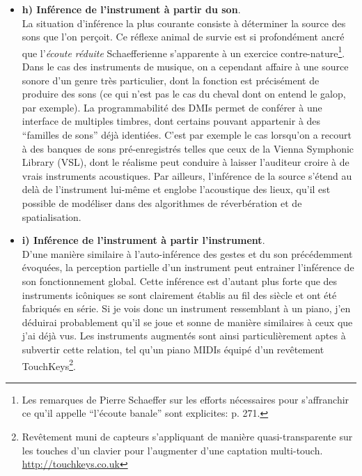 \begin{itemize}[noitemsep]
	\item \textbf{h) Inférence de l'instrument à partir du son}.\\
	\label{sec:gesture:inferences-soudure:inferences:instrument-sound}
	La situation d'inférence la plus courante consiste à déterminer la source des sons que l'on perçoit. Ce réflexe animal de survie est si profondément ancré que l'\textit{écoute réduite} Schaefferienne s'apparente à un exercice contre-nature\footnote{Les remarques de Pierre Schaeffer sur les efforts nécessaires pour s'affranchir ce qu'il appelle ``l'écoute banale'' sont explicites:  \cite{schaeffer_traite_1966} p. 271.}. Dans le cas des instruments de musique, on a cependant affaire à une source sonore d'un genre très particulier, dont la fonction est précisément de produire des sons (ce qui n'est pas le cas du cheval dont on entend le galop, par exemple). La programmabilité des \glspl{DMI} permet de conférer à une interface de multiples timbres, dont certains pouvant appartenir à des ``familles de sons'' déjà identiées. C'est par exemple le cas lorsqu'on a recourt à des banques de sons pré-enregistrés telles que ceux de la Vienna Symphonic Library (VSL), dont le réalisme peut conduire à laisser l'auditeur croire à de vrais instruments acoustiques. Par ailleurs, l'inférence de la source s'étend au delà de l'instrument lui-même et englobe l'acoustique des lieux, qu'il est possible de modéliser dans des algorithmes de réverbération et de spatialisation.

	\item \textbf{i) Inférence de l'instrument à partir l'instrument}.\\
	D'une manière similaire à l'auto-inférence des gestes et du son précédemment évoquées, la perception partielle d'un instrument peut entrainer l'inférence de son fonctionnement global. Cette inférence est d'autant plus forte que des instruments icôniques se sont clairement établis au fil des siècle et ont été fabriqués en série. Si je vois donc un instrument ressemblant à un piano, j'en déduirai probablement qu'il se joue et sonne de manière similaires à ceux que j'ai déjà vus. Les instruments augmentés sont ainsi particulièrement aptes à subvertir cette relation, tel qu'un piano \glspl{MIDI} équipé d'un revêtement TouchKeys\footnote{Revêtement muni de capteurs s'appliquant de manière quasi-transparente sur les touches d'un clavier pour l'augmenter d'une captation multi-touch. \url{http://touchkeys.co.uk}}.


\end{itemize}
